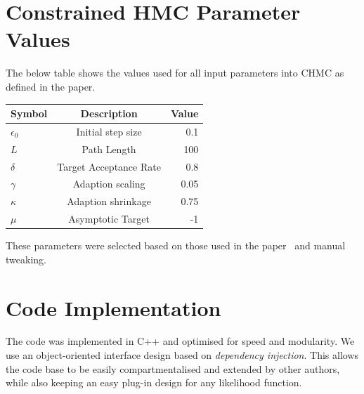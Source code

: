 \documentclass[11pt]{article}
\begin{document}
\appendix
\section{Constrained HMC Parameter Values}\label{sec:param_table}
    The below table shows the values used for all input parameters into CHMC as defined in the paper.

    \begin{center}
    \begin{tabular}{|l|c|r|}  %
        \hline  %
        Symbol & Description & Value \\
        \hline
        $\epsilon_0$  & Initial step size   & 0.1   \\
        $L$  & Path Length   & 100   \\
        $\delta$  & Target Acceptance Rate   & 0.8   \\
        $\gamma$  & Adaption scaling  & 0.05  \\
        $\kappa$  & Adaption shrinkage  & 0.75  \\
        $\mu$  & Asymptotic Target & -1  \\
        \hline
    \end{tabular}
    \end{center}
    These parameters were selected based on those used in the paper~\cite{hoffman2011nouturn} and manual tweaking.

\section{Code Implementation}\label{sec:code_implementation}
    The code was implemented in C++ and optimised for speed and modularity.
    We use an object-oriented interface design based on \emph{dependency injection}.
    This allows the code base to be easily compartmentalised and extended by other authors, while also keeping an easy
    plug-in design for any likelihood function.
\end{document}
